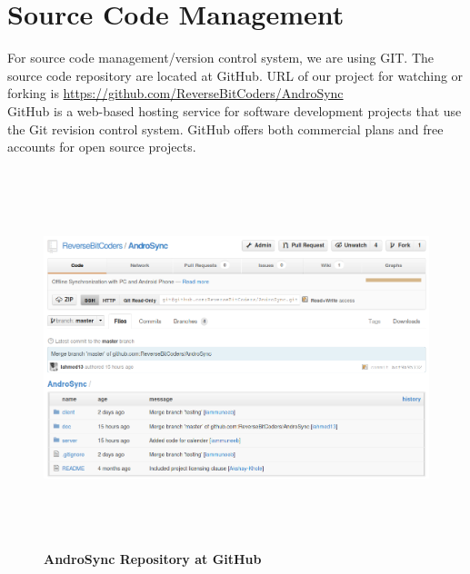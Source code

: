 \section{Source Code Management}
\hspace*{0.82cm}For source code management/version control system, we are using GIT. The source code repository are located at GitHub. URL of 
our project for watching or forking is \url{https://github.com/ReverseBitCoders/AndroSync}\\[0.5cm]
\hspace*{0.82cm}GitHub is a web-based hosting service for software development projects that use the Git revision control system. GitHub offers 
both commercial plans and free accounts for open source projects.\\[2cm]

\begin{figure}[H]
  \centering
    \includegraphics[height= 11cm, width=17cm]{project/images/GitHub/github}
  \caption{\textbf{AndroSync Repository at GitHub}}
\end{figure}

